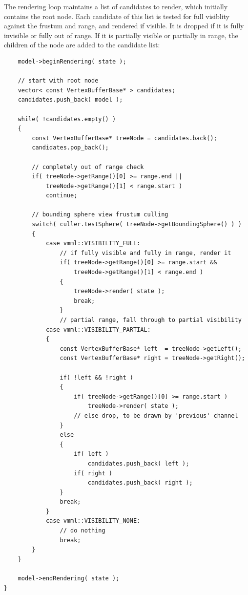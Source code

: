 \documentclass[10pt,a4]{scrartcl}
\begin{document}
The rendering loop maintains a list of candidates to render, which
initially contains the root node. Each candidate of this list is tested
for full visiblity against the frustum and range, and rendered if
visible. It is dropped if it is fully invisible or fully out of
range. If it is partially visible or partially in range, the children of
the node are added to the candidate list:

{\footnotesize\begin{lstlisting}
    model->beginRendering( state );
        
    // start with root node
    vector< const VertexBufferBase* > candidates;
    candidates.push_back( model );
        
    while( !candidates.empty() )
    {
        const VertexBufferBase* treeNode = candidates.back();
        candidates.pop_back();
            
        // completely out of range check
        if( treeNode->getRange()[0] >= range.end || 
            treeNode->getRange()[1] < range.start )
            continue;
            
        // bounding sphere view frustum culling
        switch( culler.testSphere( treeNode->getBoundingSphere() ) )
        {
            case vmml::VISIBILITY_FULL:
                // if fully visible and fully in range, render it
                if( treeNode->getRange()[0] >= range.start && 
                    treeNode->getRange()[1] < range.end )
                {
                    treeNode->render( state );
                    break;
                }
                // partial range, fall through to partial visibility
            case vmml::VISIBILITY_PARTIAL:
            {
                const VertexBufferBase* left  = treeNode->getLeft();
                const VertexBufferBase* right = treeNode->getRight();
            
                if( !left && !right )
                {
                    if( treeNode->getRange()[0] >= range.start )
                        treeNode->render( state );
                    // else drop, to be drawn by 'previous' channel
                }
                else
                {
                    if( left )
                        candidates.push_back( left );
                    if( right )
                        candidates.push_back( right );
                }
                break;
            }
            case vmml::VISIBILITY_NONE:
                // do nothing
                break;
        }
    }
        
    model->endRendering( state );
}
\end{lstlisting}}
\end{document}
